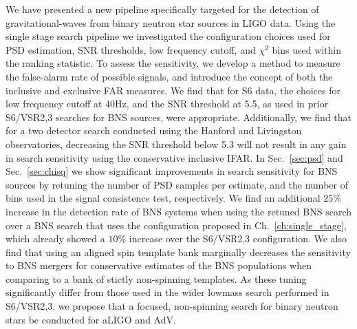 We have presented a new pipeline specifically targeted for the detection of gravitational-waves from binary neutron star sources in LIGO data. Using the single stage search pipeline we investigated the configuration choices used for PSD estimation, SNR thresholds, low frequency cutoff, and $\chi^2$ bins used within the ranking statistic. To assess the sensitivity, we develop a method to measure the false-alarm rate of possible signals, and introduce the concept of both the inclusive and exclusive FAR measures. We find that for S6 data, the choices for low frequency cutoff at 40Hz, and the SNR threshold at 5.5, as used in prior S6/VSR2,3 searches for BNS sources, were appropriate. Additionally, we find that for a two detector search conducted using the Hanford and Livingston observatories, decreasing the SNR threshold below 5.3 will not result in any gain in search sensitivity using the conservative inclusive IFAR. In Sec.~\ref{sec:psd} and Sec.~\ref{sec:chisq} we show significant improvements in search sensitivity for BNS sources by retuning the number of PSD samples per estimate, and the number of bins used in the signal consistence test, respectively. We find an additional $25\%$ increase in the detection rate of BNS systems when using the retuned BNS search over a BNS search that uses the configuration proposed in Ch.~\ref{ch:single_stage}, which already showed a $10\%$ increase over the S6/VSR2,3 configuration. We also find that using an aligned spin template bank marginally decreases the sensitivity 
to BNS mergers for conservative estimates of the BNS populations when comparing to a bank of stictly non-spinning templates. As these tuning significantly differ from those used in the wider lowmass search performed in S6/VSR2,3, we propose that a focused, non-spinning search for binary neutron stars be conducted for aLIGO and AdV.
